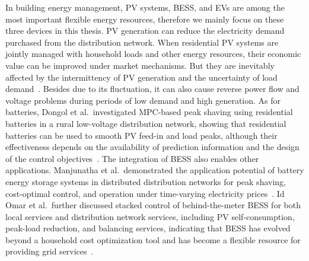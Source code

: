 In building energy management, PV systems, BESS, and EVs are among the most important flexible energy resources, therefore we mainly focus on these three devices in this thesis. PV generation can reduce the electricity demand purchased from the distribution network. When residential PV systems are jointly managed with household loads and other energy resources, their economic value can be improved under market mechanisms. But they are inevitably affected by the intermittency of PV generation and the uncertainty of load demand~\parencite{CLASTRES201055}. Besides due to its fluctuation, it can also cause reverse power flow and voltage problems during periods of low demand and high generation. As for batteries, Dongol et al.\ investigated MPC-based peak shaving using residential batteries in a rural low-voltage distribution network, showing that residential batteries can be used to smooth PV feed-in and load peaks, although their effectiveness depends on the availability of prediction information and the design of the control objectives~\parencite{DONGOL20181}. The integration of BESS also enables other applications. Manjunatha et al.\ demonstrated the application potential of battery energy storage systems in distributed distribution networks for peak shaving, cost-optimal control, and operation under time-varying electricity prices~\parencite{6652143}. Id Omar et al.\ further discussed stacked control of behind-the-meter BESS for both local services and distribution network services, including PV self-consumption, peak-load reduction, and balancing services, indicating that BESS has evolved beyond a household cost optimization tool and has become a flexible resource for providing grid services~\parencite{IDOMAR2026100249}.

